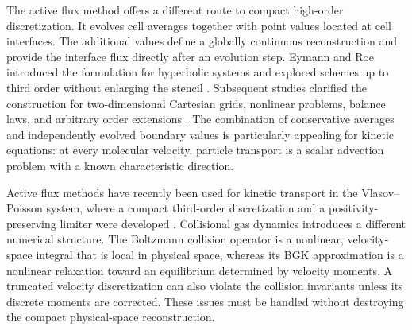 \documentclass[preprint,3p,12pt]{elsarticle}
\begin{document}
The active flux method offers a different route to compact high-order discretization. It evolves cell averages together with point values located at cell interfaces. The additional values define a globally continuous reconstruction and provide the interface flux directly after an evolution step. Eymann and Roe introduced the formulation for hyperbolic systems and explored schemes up to third order without enlarging the stencil \cite{eymann2011active}. Subsequent studies clarified the construction for two-dimensional Cartesian grids, nonlinear problems, balance laws, and arbitrary order extensions \cite{barsukow2019cartesian,barsukow2021nonlinear,barsukow2021source,abgrall2023extensions}. The combination of conservative averages and independently evolved boundary values is particularly appealing for kinetic equations: at every molecular velocity, particle transport is a scalar advection problem with a known characteristic direction.

Active flux methods have recently been used for kinetic transport in the Vlasov--Poisson system, where a compact third-order discretization and a positivity-preserving limiter were developed \cite{kiechle2025positivity}. Collisional gas dynamics introduces a different numerical structure. The Boltzmann collision operator is a nonlinear, velocity-space integral that is local in physical space, whereas its BGK approximation is a nonlinear relaxation toward an equilibrium determined by velocity moments. A truncated velocity discretization can also violate the collision invariants unless its discrete moments are corrected. These issues must be handled without destroying the compact physical-space reconstruction.
\end{document}
